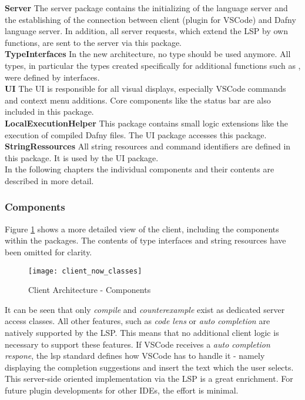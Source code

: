 {\bf Server} \textendash{}
The server package contains the initializing of the language server and the establishing of the connection between client (plugin for VSCode) and Dafny language server. In addition, all server requests, which extend the LSP by own functions, are sent to the server via this package. \\

{\bf TypeInterfaces} \textendash{}
In the new architecture, no  type should be used anymore. All types, in particular the types created specifically for additional functions such as , were defined by interfaces. \\

{\bf UI} \textendash{}
The UI is responsible for all visual displays, especially VSCode commands and context menu additions. Core components like the status bar are also included in this package. \\

{\bf LocalExecutionHelper} \textendash{}
This package contains small logic extensions like the execution of compiled Dafny files. The UI package accesses this package. \\

{\bf StringRessources} \textendash{}
All string resources and command identifiers are defined in this package. It is used by the UI package. \\

In the following chapters the individual components and their contents are described in more detail.

\subsubsection{Components}
Figure \ref{fig:client_now_classes} shows a more detailed view of the client, including the components within the packages. The contents of type interfaces and string resources have been omitted for clarity. \\

\begin{figure}[H]
    \centering
    \texttt{[image: client\_now\_classes]}
    \caption{Client Architecture - Components}
    \label{fig:client_now_classes}
\end{figure}

It can be seen that only \textit{compile} and \textit{counterexample} exist as dedicated server access classes. All other features, such as \textit{code lens} or \textit{auto completion} are natively supported by the LSP. This means that no additional client logic is necessary to support these features. If VSCode receives a \textit{auto completion respone}, the lsp standard defines how VSCode has to handle it - namely displaying the completion suggestions and insert the text which the user selects. This server-side oriented implementation via the LSP is a great enrichment. For future plugin developments for other IDEs, the effort is minimal.

